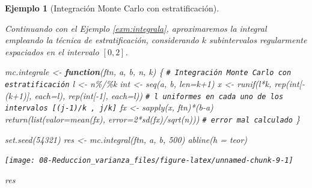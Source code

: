 \documentclass[
]{book}
\newenvironment{Shaded}{\begin{snugshade}}{\end{snugshade}}
\newcommand{\AttributeTok}[1]{\textcolor[rgb]{0.77,0.63,0.00}{#1}}
\newcommand{\CommentTok}[1]{\textcolor[rgb]{0.56,0.35,0.01}{\textit{#1}}}
\newcommand{\ControlFlowTok}[1]{\textcolor[rgb]{0.13,0.29,0.53}{\textbf{#1}}}
\newcommand{\DecValTok}[1]{\textcolor[rgb]{0.00,0.00,0.81}{#1}}
\newcommand{\FunctionTok}[1]{\textcolor[rgb]{0.00,0.00,0.00}{#1}}
\newcommand{\NormalTok}[1]{#1}
\newcommand{\OtherTok}[1]{\textcolor[rgb]{0.56,0.35,0.01}{#1}}
\newcommand{\SpecialCharTok}[1]{\textcolor[rgb]{0.00,0.00,0.00}{#1}}
\theoremstyle{break}
\newtheorem{example}{Ejemplo}[chapter]
\theoremstyle{nonumberplain}
\renewcommand{\CommentTok}[1]{\textcolor[rgb]{0.41,0.41,0.41}{\texttt{#1}}}
\begin{document}
\begin{example}[Integración Monte Carlo con estratificación]
\protect\hypertarget{exm:integrale}{}\label{exm:integrale}

Continuando con el Ejemplo \ref{exm:integrala}, aproximaremos la integral empleando la técnica de estratificación, considerando \(k\) subintervalos regularmente espaciados en el intervalo \(\left[ 0, 2 \right]\).

\begin{Shaded}
\begin{Highlighting}[]
\NormalTok{mc.integrale }\OtherTok{\textless{}{-}} \ControlFlowTok{function}\NormalTok{(ftn, a, b, n, k) \{}
  \CommentTok{\# Integración Monte Carlo con estratificación}
\NormalTok{  l }\OtherTok{\textless{}{-}}\NormalTok{ n}\SpecialCharTok{\%/\%}\NormalTok{k}
\NormalTok{  int }\OtherTok{\textless{}{-}} \FunctionTok{seq}\NormalTok{(a, b, }\AttributeTok{len=}\NormalTok{k}\SpecialCharTok{+}\DecValTok{1}\NormalTok{)}
\NormalTok{  x }\OtherTok{\textless{}{-}} \FunctionTok{runif}\NormalTok{(l}\SpecialCharTok{*}\NormalTok{k, }\FunctionTok{rep}\NormalTok{(int[}\SpecialCharTok{{-}}\NormalTok{(k}\SpecialCharTok{+}\DecValTok{1}\NormalTok{)], }\AttributeTok{each=}\NormalTok{l), }\FunctionTok{rep}\NormalTok{(int[}\SpecialCharTok{{-}}\DecValTok{1}\NormalTok{], }\AttributeTok{each=}\NormalTok{l))}
  \CommentTok{\# l uniformes en cada uno de los intervalos [(j{-}1)/k , j/k]}
\NormalTok{  fx }\OtherTok{\textless{}{-}} \FunctionTok{sapply}\NormalTok{(x, ftn)}\SpecialCharTok{*}\NormalTok{(b}\SpecialCharTok{{-}}\NormalTok{a)}
  \FunctionTok{return}\NormalTok{(}\FunctionTok{list}\NormalTok{(}\AttributeTok{valor=}\FunctionTok{mean}\NormalTok{(fx), }\AttributeTok{error=}\DecValTok{2}\SpecialCharTok{*}\FunctionTok{sd}\NormalTok{(fx)}\SpecialCharTok{/}\FunctionTok{sqrt}\NormalTok{(n)))   }\CommentTok{\# error mal calculado}
\NormalTok{\}}

\FunctionTok{set.seed}\NormalTok{(}\DecValTok{54321}\NormalTok{)}
\NormalTok{res }\OtherTok{\textless{}{-}} \FunctionTok{mc.integral}\NormalTok{(ftn, a, b, }\DecValTok{500}\NormalTok{)}
\FunctionTok{abline}\NormalTok{(}\AttributeTok{h =}\NormalTok{ teor)}
\end{Highlighting}
\end{Shaded}

\begin{center}\texttt{[image: 08-Reduccion\_varianza\_files/figure-latex/unnamed-chunk-9-1]} \end{center}

\begin{Shaded}
\begin{Highlighting}[]
\NormalTok{res}
\end{Highlighting}
\end{Shaded}


\end{example}
\end{document}
